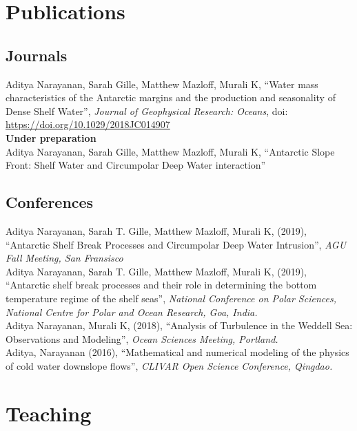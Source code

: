\documentclass[10pt, a4paper]{article}
\newcommand{\years}[1]{\marginnote{\scriptsize #1}}
\begin{document}
\section*{Publications}

\subsection*{\bf Journals}
\years{2019}Aditya Narayanan, Sarah Gille, Matthew Mazloff, Murali K, ``Water mass characteristics of the Antarctic margins and the production and seasonality of Dense Shelf Water'', \emph{Journal of Geophysical Research: Oceans}, doi: \url{https://doi.org/10.1029/2018JC014907}\\

{\bf Under preparation}\\

\years{}Aditya Narayanan, Sarah Gille, Matthew Mazloff, Murali K, ``Antarctic Slope Front: Shelf Water and Circumpolar Deep Water interaction''\\


\subsection*{\bf Conferences}
\years{2019}Aditya Narayanan, Sarah T. Gille, Matthew Mazloff, Murali K, (2019), ``Antarctic Shelf Break Processes and Circumpolar Deep Water Intrusion'', \emph{AGU Fall Meeting, San Fransisco}\\

\years{2019}Aditya Narayanan, Sarah T. Gille, Matthew Mazloff, Murali K, (2019), ``Antarctic shelf break processes and their role in determining the bottom temperature regime of the shelf seas'', \emph{National Conference on Polar Sciences, National Centre for Polar and Ocean Research, Goa, India.}\\

\years{2018}Aditya Narayanan, Murali K, (2018), ``Analysis of Turbulence in the Weddell Sea: Observations and Modeling'', \emph{Ocean Sciences Meeting, Portland.}\\

\years{2016}Aditya, Narayanan (2016), ``Mathematical and numerical modeling of the physics of cold water downslope flows'', \emph{CLIVAR Open Science Conference, Qingdao.}



\section*{Teaching}
\end{document}
